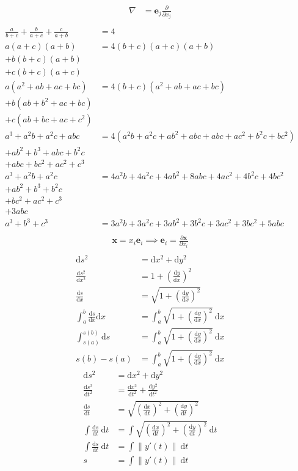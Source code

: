 \documentclass[a4paper,11pt]{article}
\theoremstyle{plain}
\theoremstyle{definition}
\newcommand{\dx}{\text{d}}
\newcommand{\del}{\partial}
\begin{document}
\begin{align*}
	\nabla &= \mathbf{e}_j\frac{\del}{\del x_j} \\
\end{align*}
\begin{align*}
	\frac{a}{b+c}+\frac{b}{a+c}+\frac{c}{a+b} &= 4 \\
	a(a+c)(a+b) &= 4(b+c)(a+c)(a+b) \\
	+b(b+c)(a+b)& \\
	+c(b+c)(a+c)& \\
	a(a^2+ab+ac+bc) &= 4(b+c)(a^2+ab+ac+bc) \\
	+b(ab+b^2+ac+bc)& \\
	+c(ab+bc+ac+c^2)& \\
	a^3+a^2b+a^2c+abc &= 4(a^2b+a^2c+ab^2+abc+abc+ac^2+b^2c+bc^2) \\
	+ab^2+b^3+abc+b^2c&\\
	+abc+bc^2+ac^2+c^3&\\
	a^3+a^2b+a^2c &= 4a^2b+4a^2c+4ab^2+8abc+4ac^2+4b^2c+4bc^2 \\
	+ab^2+b^3+b^2c&\\
	+bc^2+ac^2+c^3&\\
			 +3abc&\\
	a^3+b^3+c^3 &= 3a^2b+3a^2c+3ab^2+3b^2c+3ac^2+3bc^2+5abc \\
\end{align*}
\begin{align*}
	\mathbf{x}=x_i\mathbf{e}_i \implies \mathbf{e}_i = \frac{\del
	\mathbf{x}}{\del x_i} \\
\end{align*}
\newpage
\begin{align*}
	\dx s^2 &= \dx x^2+\dx y^2 \\
	\frac{\dx s^2}{\dx x^2} &= 1+{\left(\frac{\dx y}{\dx x}\right)}^2 \\
	\frac{\dx s}{\dx x} &= \sqrt{1+{\left(\frac{\dx y}{\dx x}\right)}^2} \\
	\int_a^b \frac{\dx s}{\dx x} \dx x &= \int_a^b\sqrt{1+{\left(\frac{\dx
	y}{\dx x}\right)}^2}\ \dx x \\
	\int_{s(a)}^{s(b)} \dx s &= \int_a^b\sqrt{1+{\left(\frac{\dx y}{\dx
	x}\right)}^2}\ \dx x \\
	s(b)-s(a) &= \int_a^b\sqrt{1+{\left(\frac{\dx y}{\dx x}\right)}^2}\ \dx x
\end{align*}
\begin{align*}
	\dx s^2 &= \dx x^2+\dx y^2 \\
	\frac{\dx s^2}{\dx t^2} &= \frac{\dx x^2}{\dx t^2} + \frac{\dx y^2}{\dx t^2} \\
	\frac{\dx s}{\dx t} &= \sqrt{\left(\frac{\dx x}{\dx t}\right)^2 + {\left(\frac{\dx y}{\dx t}\right)}^2} \\
	\int \frac{\dx s}{\dx t}\ \dx t &= \int 
	\sqrt{\left(\frac{\dx x}{\dx t}\right)^2 + {\left(\frac{\dx y}{\dx
	t}\right)}^2}\ \dx t \\
	\int \frac{\dx s}{\dx t}\ \dx t &= \int \|y'(t)\|\ \dx t \\
	s &= \int \|y'(t)\|\ \dx t \\
\end{align*}
\end{document}
